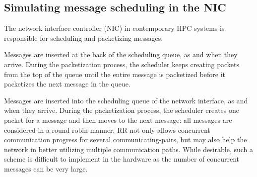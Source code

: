 \subsection{Simulating message scheduling in the NIC}

The network interface controller (NIC) in contemporary HPC systems is
responsible for scheduling and packetizing messages.

\vspace{0.08in}
Messages are inserted
at the back of the scheduling queue, as and when they arrive.
During the packetization process, %
the scheduler keeps creating packets from the top of the queue until
the entire message is packetized before it packetizes the next message in the queue. 

\vspace{0.08in}
 Messages are inserted into the scheduling queue of
the network interface, as and when they arrive. During the packetization process,
the scheduler creates one packet for a message and then moves to the next message:
all messages are considered in a round-robin manner. 
RR not only allows concurrent communication
progress for several communicating-pairs, but may also help the network in
better utilizing multiple communication paths. While desirable, such a scheme is
difficult to implement in the hardware as the number of concurrent messages can
be very large.

\vspace{0.08in}

